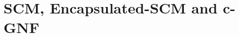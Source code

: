 \documentclass[letterpaper]{article} %
\begin{document}
\section{SCM, Encapsulated-SCM and c-GNF}\label{sec:gnf}%
\end{document}
